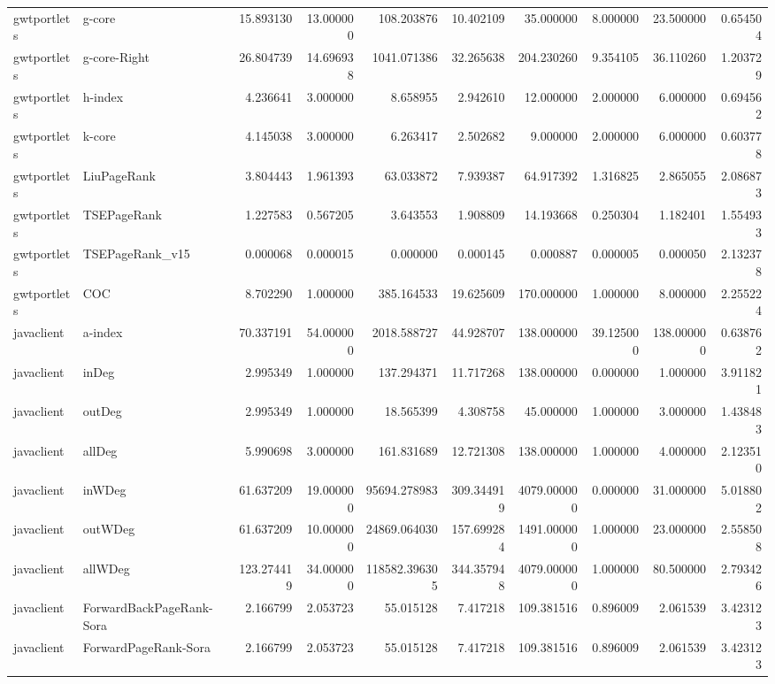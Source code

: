 \begin{tabular}{llrrrrrrrr}
gwtportlets & g-core & 15.893130 & 13.000000 & 108.203876 & 10.402109 & 35.000000 & 8.000000 & 23.500000 & 0.654504 \\
gwtportlets & g-core-Right & 26.804739 & 14.696938 & 1041.071386 & 32.265638 & 204.230260 & 9.354105 & 36.110260 & 1.203729 \\
gwtportlets & h-index & 4.236641 & 3.000000 & 8.658955 & 2.942610 & 12.000000 & 2.000000 & 6.000000 & 0.694562 \\
gwtportlets & k-core & 4.145038 & 3.000000 & 6.263417 & 2.502682 & 9.000000 & 2.000000 & 6.000000 & 0.603778 \\
gwtportlets & LiuPageRank & 3.804443 & 1.961393 & 63.033872 & 7.939387 & 64.917392 & 1.316825 & 2.865055 & 2.086873 \\
gwtportlets & TSEPageRank & 1.227583 & 0.567205 & 3.643553 & 1.908809 & 14.193668 & 0.250304 & 1.182401 & 1.554933 \\
gwtportlets & TSEPageRank_v15 & 0.000068 & 0.000015 & 0.000000 & 0.000145 & 0.000887 & 0.000005 & 0.000050 & 2.132378 \\
gwtportlets & COC & 8.702290 & 1.000000 & 385.164533 & 19.625609 & 170.000000 & 1.000000 & 8.000000 & 2.255224 \\
javaclient & a-index & 70.337191 & 54.000000 & 2018.588727 & 44.928707 & 138.000000 & 39.125000 & 138.000000 & 0.638762 \\
javaclient & inDeg & 2.995349 & 1.000000 & 137.294371 & 11.717268 & 138.000000 & 0.000000 & 1.000000 & 3.911821 \\
javaclient & outDeg & 2.995349 & 1.000000 & 18.565399 & 4.308758 & 45.000000 & 1.000000 & 3.000000 & 1.438483 \\
javaclient & allDeg & 5.990698 & 3.000000 & 161.831689 & 12.721308 & 138.000000 & 1.000000 & 4.000000 & 2.123510 \\
javaclient & inWDeg & 61.637209 & 19.000000 & 95694.278983 & 309.344919 & 4079.000000 & 0.000000 & 31.000000 & 5.018802 \\
javaclient & outWDeg & 61.637209 & 10.000000 & 24869.064030 & 157.699284 & 1491.000000 & 1.000000 & 23.000000 & 2.558508 \\
javaclient & allWDeg & 123.274419 & 34.000000 & 118582.396305 & 344.357948 & 4079.000000 & 1.000000 & 80.500000 & 2.793426 \\
javaclient & ForwardBackPageRank-Sora & 2.166799 & 2.053723 & 55.015128 & 7.417218 & 109.381516 & 0.896009 & 2.061539 & 3.423123 \\
javaclient & ForwardPageRank-Sora & 2.166799 & 2.053723 & 55.015128 & 7.417218 & 109.381516 & 0.896009 & 2.061539 & 3.423123 \\

\end{tabular}
